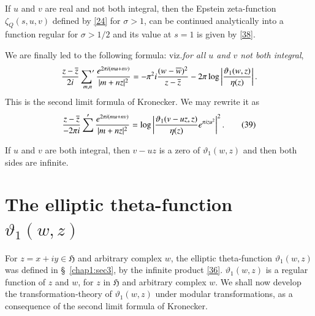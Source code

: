 \begin{thm}\label{chap1:thm2}
If $u$ and $v$ are real and not both integral, then the Epstein
zeta-function $\zeta_{Q}(s,u,v)$ defined by \eqref{24} for $\sigma>1$,
can be continued analytically into a function regular for $\sigma>1/2$
and its value at $s=1$ is given by \eqref{38}. 
\end{thm}

We are finally led to the following formula: viz.\@ {\em for all $u$
  and $v$ not both integral},
$$
\frac{z-\overline{z}}{2i}\mathop{{\sum}'}_{m,n}\frac{e^{2\pi
    i(mu+nv)}}{|m+nz|^{2}}=-\pi^{2}i\frac{(w-\overline{w})^{2}}{z-\overline{z}}-2\pi
\log \left|\frac{\vartheta_{1}(w,z)}{\eta(z)}\right|.
$$
This is the second limit formula of Kronecker. We may rewrite it as
\begin{equation*}
\frac{z-\overline{z}}{-2\pi i}\sum'\frac{e^{2\pi i(mu+nv)}}{|m+nz|^{2}}=\log
\left|\frac{\vartheta_{1}(v-uz,z)}{\eta(z)}e^{\pi
  izu^{2}}\right|^{2}.\tag{39}\label{39} 
\end{equation*}

If $u$ and $v$ are both integral, then $v-uz$ is a zero of
$\vartheta_{1}(w,z)$ and then both sides are infinite.

\section{The elliptic theta-function $\vartheta_{1}(w,z)$}\label{chap1:sec4}

For $z=x+iy\in\mathfrak{H}$ and arbitrary complex $w$, the elliptic
theta-function $\vartheta_{1}(w,z)$ was defined in \S\ \ref{chap1:sec3}, by
the infinite product \eqref{36}. $\vartheta_{1}(w,z)$ is a regular
function of $z$ and $w$, for $z$ in $\mathfrak{H}$ and arbitrary
complex $w$. We shall now develop the transformation-theory of
$\vartheta_{1}(w,z)$ under modular transformations, as a consequence
of the second limit formula of Kronecker.

